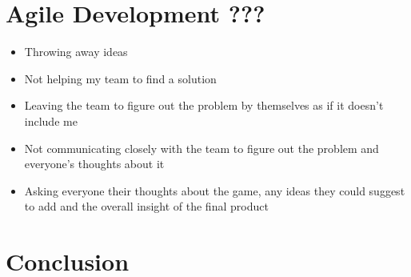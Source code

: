 \documentclass{scrartcl}
\begin{document}
\section{Agile Development ???}
\begin{itemize}
	\item Throwing away ideas
	\item Not helping my team to find a solution
	\item Leaving the team to figure out the problem by themselves as if it doesn't include me
	\item Not communicating closely with the team to figure out the problem and everyone's thoughts about it
	\item Asking everyone their thoughts about the game, any ideas they could suggest to add and the overall insight of the final product
\end{itemize}

\section{}

\section{}

\section{}

\section{Conclusion}



\end{document}
